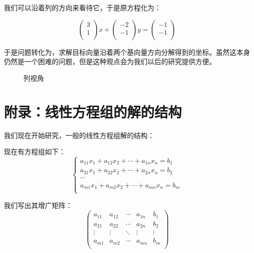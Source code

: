 \documentclass[a4paper]{ctexart}
\begin{document}
我们可以沿着列的方向来看待它，于是原方程化为：

$$
\left(
\begin{array}{cccc}
 3\\
 1\\
\end{array}
\right )x
+
\left(
\begin{array}{cccc}
 -2\\
 -1\\
\end{array}
\right )y
=
\left(
\begin{array}{cccc}
-1\\
-1\\
\end{array}
\right )
$$

于是问题转化为，求解目标向量沿着两个基向量方向分解得到的坐标。虽然这本身仍然是一个困难的问题，但是这种观点会为我们以后的研究提供方便。

\begin{figure}[htp]
\centering
{}
\caption{列视角}
\end{figure}

\section{附录：线性方程组的解的结构}
我们现在开始研究，一般的线性方程组解的结构：

现在有方程组如下：
$$
\begin{cases}
a_{11}x_{1}+a_{12}x_{2}+\cdots+a_{1n}x_{n}=b_{1}\\
a_{21}x_{1}+a_{22}x_{2}+\cdots+a_{2n}x_{n}=b_{2}\\
\cdots\\
a_{m1}x_{1}+a_{m2}x_{2}+\cdots+a_{mn}x_{n}=b_{m}\\
\end{cases}
$$

我们写出其增广矩阵：
$$
\begin{pmatrix}
a_{11}&a_{12}&\cdots&a_{1n}&b_{1}\\
a_{21}&a_{22}&\cdots&a_{2n}&b_{2}\\
\vdots&\vdots&\ddots&\vdots&\vdots\\
a_{m1}&a_{m2}&\cdots&a_{mn}&b_{m}\\
\end{pmatrix}
$$
\end{document}
